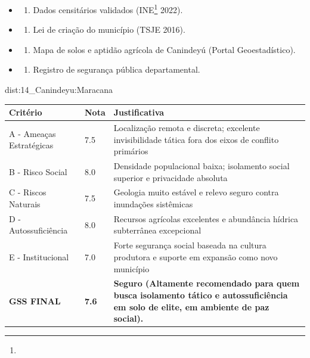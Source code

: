 {\begin{itemize}
\tightlist
\item
  \begin{enumerate}
  \def\labelenumi{\arabic{enumi})}
  \tightlist
  \item
    Dados censitários validados (INE\footnote{\fineINE} 2022).
  \end{enumerate}
\item
  \begin{enumerate}
  \def\labelenumi{\arabic{enumi})}
  \setcounter{enumi}{1}
  \tightlist
  \item
    Lei de criação do município (TSJE 2016).
  \end{enumerate}
\item
  \begin{enumerate}
  \def\labelenumi{\arabic{enumi})}
  \setcounter{enumi}{2}
  \tightlist
  \item
    Mapa de solos e aptidão agrícola de Canindeyú (Portal
    Geoestadístico).
  \end{enumerate}
\item
  \begin{enumerate}
  \def\labelenumi{\arabic{enumi})}
  \setcounter{enumi}{3}
  \tightlist
  \item
    Registro de segurança pública departamental.
  \end{enumerate}
\end{itemize}}{dist:14_Canindeyu:Maracana}
\begin{table}[ht!]
\small \begin{tabular}{p{3.0cm}p{0.8cm}p{6.0cm}} \toprule
\textbf{Critério} & \textbf{Nota} & \textbf{Justificativa} \\ \midrule
A - Ameaças Estratégicas & 7.5 & Localização remota e discreta; excelente invisibilidade tática fora dos eixos de conflito primários \\
B - Risco Social & 8.0 & Densidade populacional baixa; isolamento social superior e privacidade absoluta \\
C - Riscos Naturais & 7.5 & Geologia muito estável e relevo seguro contra inundações sistêmicas \\
D - Autossuficiência & 8.0 & Recursos agrícolas excelentes e abundância hídrica subterrânea excepcional \\
E - Institucional & 7.0 & Forte segurança social baseada na cultura produtora e suporte em expansão como novo município \\
\midrule \textbf{GSS FINAL} & \textbf{7.6} & \textbf{Seguro (Altamente recomendado para quem busca isolamento tático e autossuficiência em solo de elite, em ambiente de paz social).} \\ \bottomrule \end{tabular}
\end{table}
